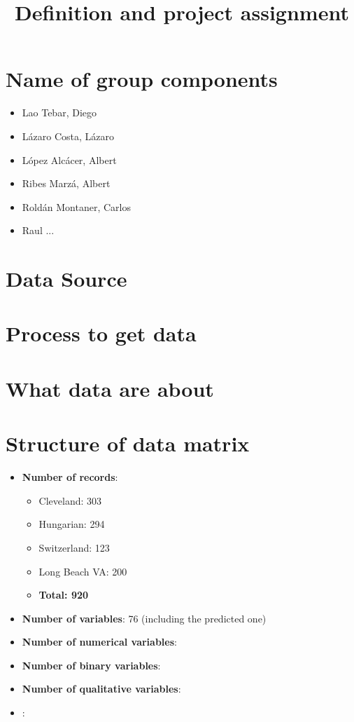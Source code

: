 \documentclass[a4paper,10pt]{article}
\title{Definition and project assignment}
\begin{document}
\maketitle

% 

\section{Name of group components}
\begin{itemize}
 \item Lao Tebar, Diego
 \item Lázaro Costa, Lázaro
 \item López Alcácer, Albert
  \item Ribes Marzá, Albert
 \item Roldán Montaner, Carlos
 \item Raul ...
\end{itemize}

\section{Data Source}
\section{Process to get data}
\section{What data are about}
\section{Structure of data matrix}
\begin{itemize}
 \item \textbf{Number of records}: 
 \begin{itemize}
 \item Cleveland: 303
 \item Hungarian: 294
 \item Switzerland: 123
 \item Long Beach VA: 200
 \item \textbf{Total: 920}
 \end{itemize}
 \item \textbf{Number of variables}: 76 (including the predicted one)
 \item \textbf{Number of numerical variables}: 
 \item \textbf{Number of binary variables}: 
 \item \textbf{Number of qualitative variables}:
 \item \textbf{}: 
\end{itemize}
\end{document}
